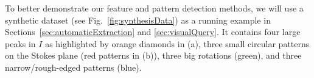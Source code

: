 To better demonstrate our feature and pattern detection methods, we will use a synthetic dataset (see Fig.~\ref{fig:synthesisData}) as a running example in Sections~\ref{sec:automaticExtraction} and \ref{sec:visualQuery}.
It contains four large peaks in $I$ as highlighted by orange diamonds in (a), three small circular patterns on the Stokes plane (red patterns in (b)), three big rotations (green), and three narrow/rough-edged patterns (blue).




